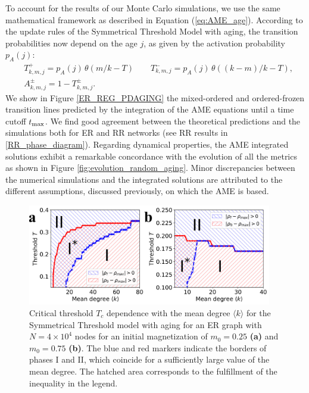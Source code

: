 To account for the results of our Monte Carlo simulations, we use the same mathematical framework as described in Equation (\ref{eq:AME_age}). According to the update rules of the Symmetrical Threshold Model with aging, the transition probabilities now depend on the age $j$, as given by the activation probability  $p_A (j)$:
\begin{eqnarray}
    &T^{+}_{k,m,j} = p_A(j) \, \theta(m/k - T) \quad \quad T^{-}_{k,m,j} = p_A(j) \, \theta((k-m)/k - T), \nonumber\\
    &A^{\pm}_{k,m,j} = 1 - T^{\pm}_{k,m,j}.
\end{eqnarray}
We show in Figure \ref{ER_REG_PDAGING} the mixed-ordered and ordered-frozen transition lines predicted by the integration of the AME equations until a time cutoff $t_{\rm max}$. We find good agreement between the theoretical predictions and the simulations both for ER and RR networks (see RR results in \ref{RR_phase_diagram}). Regarding dynamical properties, the AME integrated solutions exhibit a remarkable concordance with the evolution of all the metrics as shown in Figure \ref{fig:evolution_random_aging}. Minor discrepancies between the numerical simulations and the integrated solutions are attributed to the different assumptions, discussed previously, on which the AME is based.  
\begin{figure}
        \centering \captionsetup{font=sf}
        \includegraphics[width=0.95\textwidth]{Figs/Aging_STM/FIG8.pdf}
        \caption[Phase ${\rm I}^{*}$ dependence with the network mean degree]{\label{fig:PD_Z} Critical threshold $T_c$ dependence with the mean degree $\langle k \rangle$ for the Symmetrical Threshold model with aging for an ER graph with $N = 4 \times 10^4$ nodes for an initial magnetization of $m_0 = 0.25$ \textbf{(a)} and $m_0 = 0.75$ \textbf{(b)}. The blue and red markers indicate the borders of phases I and II, which coincide for a sufficiently large value of the mean degree. The hatched area corresponds to the fulfillment of the inequality in the legend.}
\end{figure}

